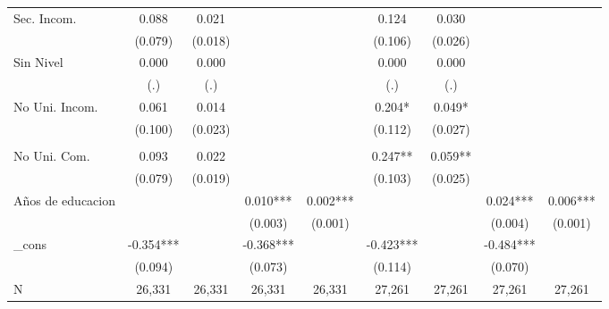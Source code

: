 \begin{table}
{\begin{threeparttable}
\begin{tabular}{lcccccccc}
Sec. Incom.         &       0.088   &       0.021   &               &               &       0.124   &       0.030   &               &               \\
                    &     (0.079)   &     (0.018)   &               &               &     (0.106)   &     (0.026)   &               &               \\
Sin Nivel           &       0.000   &       0.000   &               &               &       0.000   &       0.000   &               &               \\
                    &         (.)   &         (.)   &               &               &         (.)   &         (.)   &               &               \\
No Uni. Incom.      &       0.061   &       0.014   &               &               &       0.204*  &       0.049*  &               &               \\
                    &     (0.100)   &     (0.023)   &               &               &     (0.112)   &     (0.027)   &               &               \\
                    &               &               &               &               &               &               &               &               \\
No Uni. Com.        &       0.093   &       0.022   &               &               &       0.247** &       0.059** &               &               \\
                    &     (0.079)   &     (0.019)   &               &               &     (0.103)   &     (0.025)   &               &               \\
Años de educacion   &               &               &       0.010***&       0.002***&               &               &       0.024***&       0.006***\\
                    &               &               &     (0.003)   &     (0.001)   &               &               &     (0.004)   &     (0.001)   \\
\_cons              &      -0.354***&               &      -0.368***&               &      -0.423***&               &      -0.484***&               \\
                    &     (0.094)   &               &     (0.073)   &               &     (0.114)   &               &     (0.070)   &               \\
\midrule
N                   &      26,331   &      26,331   &      26,331   &      26,331   &      27,261   &      27,261   &      27,261   &      27,261   \\
\hline
\end{tabular}
\begin{tablenotes}
\begin{footnotesize}
\end{footnotesize}
\end{tablenotes} \end{threeparttable} } \end{table}
